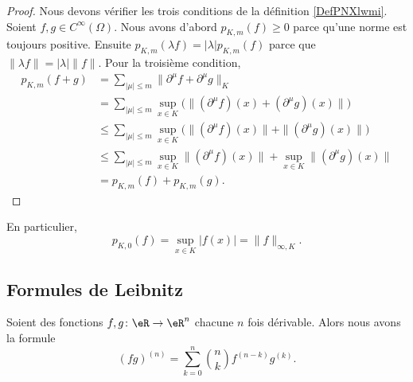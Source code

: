 \begin{proof}
	Nous devons vérifier les trois conditions de la définition \ref{DefPNXlwmi}. Soient \( f,g\in C^{\infty}(\Omega)\). Nous avons d'abord \( p_{K,m}(f)\geq 0\) parce qu'une norme est toujours positive. Ensuite \( p_{K,m}(\lambda f)=| \lambda |p_{K,m}(f)\) parce que \( \| \lambda f \|=| \lambda |\| f \|\). Pour la troisième condition,
	\begin{subequations}
		\begin{align}
			p_{K,m}(f+g) & = \sum_{| \mu |\leq m}\| \partial^{\mu}f+\partial^{\mu}g \|_{K}                                             \\
			             & =\sum_{| \mu |\leq m}\sup_{x\in K} \Big(   \| (\partial^{\mu}f)(x)+(\partial^{\mu}g)(x) \|          \Big)   \\
			             & \leq\sum_{| \mu |\leq m}\sup_{x\in K} \Big(\| (\partial^{\mu}f)(x)\|  + \|  (\partial^{\mu}g)(x) \|   \Big) \\
			             & \leq\sum_{| \mu |\leq m}\sup_{x\in K}\| (\partial^{\mu}f)(x)\|  + \sup_{x\in K} \|  (\partial^{\mu}g)(x) \| \\
			             & =p_{K,m}(f)+p_{K,m}(g).
		\end{align}
	\end{subequations}
\end{proof}

En particulier,
\begin{equation}
	p_{K,0}(f)=\sup_{x\in K}| f(x) |=\| f \|_{\infty,K}.
\end{equation}

\subsection{Formules de Leibnitz}

\begin{proposition}		\label{PROPooTEACooKXUXKl}
	Soient des fonctions \(f,g \colon \eR\to \eR^n  \) chacune \( n\) fois dérivable. Alors nous avons la formule
	\begin{equation}
		(fg)^{(n)}=\sum_{k=0}^n\binom{ n }{ k }f^{(n-k)}g^{(k)}.
	\end{equation}
\end{proposition}

